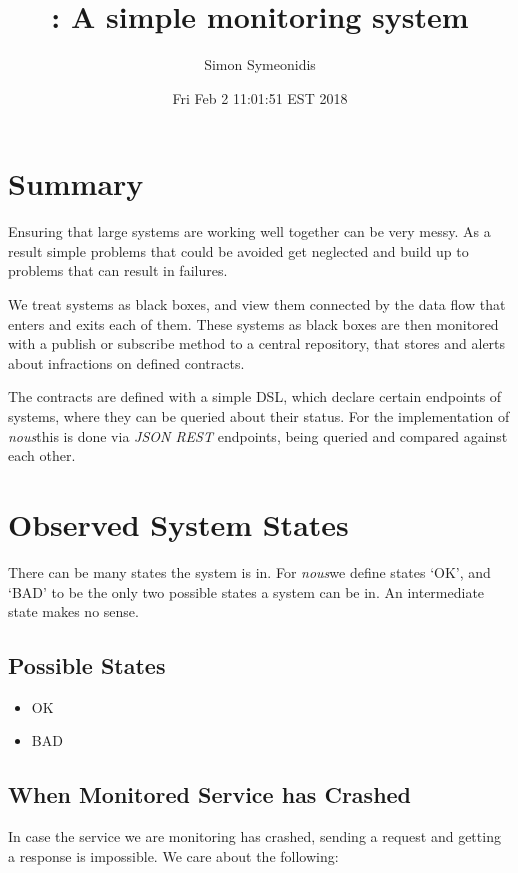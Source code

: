 \documentclass[12pt,twoside]{article}
\title{\projectname: A simple monitoring system}
\author{Simon Symeonidis}
\date{Fri Feb  2 11:01:51 EST 2018}
\newcommand{\projectname}[0]{\textit{nous}}
\begin{document}
\maketitle
\tableofcontents
\listoffigures
\lstlistoflistings



\section{Summary}
Ensuring that large systems are working well together can be
very messy. As a result simple problems that could be avoided
get neglected and build up to problems that can result in
failures.

We treat systems as black boxes, and view them connected by
the data flow that enters and exits each of them. These systems as
black boxes are then monitored with a publish or subscribe method to a
central repository, that stores and alerts about infractions on
defined contracts.

The contracts are defined with a simple DSL, which declare certain
endpoints of systems, where they can be queried about their
status. For the implementation of \projectname this is done via
\textit{JSON REST} endpoints, being queried and compared against each
other.

\section{Observed System States}
There can be many states the system is in. For \projectname we define
states `OK', and `BAD' to be the only two possible states a system can
be in. An intermediate state makes no sense.

\subsection{Possible States}
\begin{itemize}
\item OK
\item BAD
\end{itemize}

\subsection{When Monitored Service has Crashed}
In case the service we are monitoring has crashed, sending a request
and getting a response is impossible. We care about the following:
\end{document}
